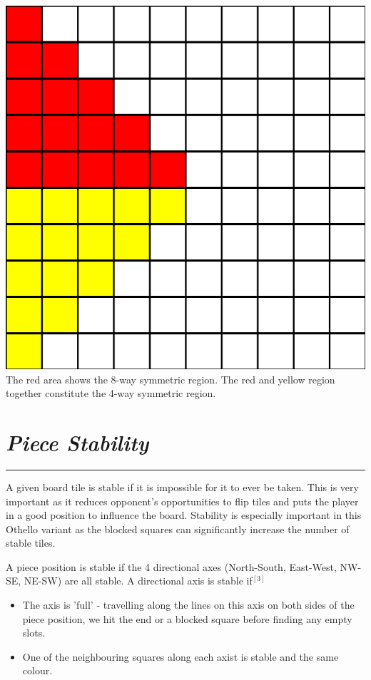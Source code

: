 \documentclass[10pt]{report}
\begin{document}
\begin{multicols}{2}
\begin{center}
\includegraphics[scale=0.25]{symmetries.png}\\
The red area shows the 8-way symmetric region. The red and yellow region together constitute the 4-way symmetric region.
\end{center}
\section*{\emph{\textmd{Piece Stability}}}
\hrule

A given board tile is stable if it is impossible for it to ever be taken. This is very important as it reduces opponent's opportunities to flip tiles and puts the player in a good position to influence the board. Stability is especially important in this Othello variant as the blocked squares can significantly increase the number of stable tiles. 

A piece position is stable if the 4 directional axes (North-South, East-West, NW-SE, NE-SW) are all stable. A directional axis is stable if$^{[3]}$
    \begin{itemize}
\item The axis is 'full' - travelling along the lines on this axis on both sides of the piece position, we hit the end or a blocked square before finding any empty slots.
\item One of the neighbouring squares along each axist is stable and the same colour.
\end{itemize}


\end{multicols}
\end{document}
